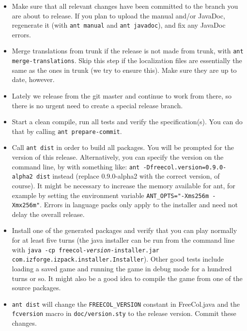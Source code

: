 \documentclass[12pt]{book}
\begin{document}
\begin{itemize}

\item Make sure that all relevant changes have been committed to the
  branch you are about to release. If you plan to upload the manual
  and/or JavaDoc, regenerate it (with \verb+ant manual+ and
  \verb+ant javadoc+), and fix any JavaDoc errors.

\item Merge translations from trunk if the release is not made from
  trunk, with \verb+ant merge-translations+. Skip this step if the
  localization files are essentially the same as the ones in trunk (we
  try to ensure this). Make sure they are up to date, however.

\item Lately we release from the git master and continue to work from
  there, so there is no urgent need to create a special release branch.

\item Start a clean compile, run all tests and verify the
  specification(s). You can do that by calling \verb+ant prepare-commit+.
 
\item Call \verb+ant dist+ in order to build all packages. You will be
  prompted for the version of this release. Alternatively, you can
  specify the version on the command line, by with something like:
  \verb+ant -Dfreecol.version=0.9.0-alpha2 dist+ instead (replace
  0.9.0-alpha2 with the correct version, of course). It might be
  necessary to increase the memory available for ant, for example by
  setting the environment variable
  \verb|ANT_OPTS="-Xms256m -Xmx256m"|. Errors in language packs only
  apply to the installer and need not delay the overall release.

\item Install one of the generated packages and verify that you can
  play normally for at least five turns (the java installer can be run
  from the command line with \texttt{java -cp
    freecol-\emph{version}-installer.jar
    com.izforge.izpack.installer.Installer}). Other good tests
  include loading a saved game and running the game in debug mode for
  a hundred turns or so. It might also be a good idea to compile the
  game from one of the source packages.

\item \verb+ant dist+ will change the \verb+FREECOL_VERSION+ constant
  in FreeCol.java and the \verb+fcversion+ macro in
  \texttt{doc/version.sty} to the release version. Commit these changes.


\end{itemize}
\end{document}
